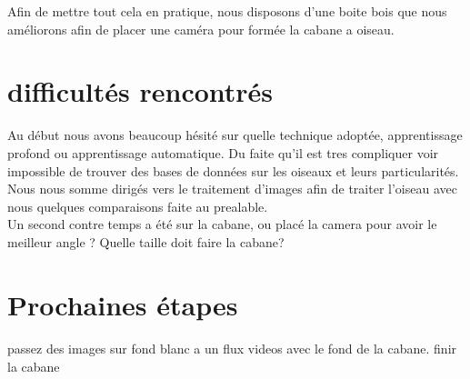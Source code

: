 \documentclass{article}
\begin{document}
Afin de mettre tout cela en pratique, nous disposons d'une boite bois que nous améliorons afin de placer une caméra pour formée la cabane a oiseau.
\section{difficultés rencontrés}
Au début nous avons beaucoup hésité sur quelle technique adoptée, apprentissage profond ou apprentissage automatique. Du faite qu'il est tres compliquer voir  impossible de trouver des bases de données sur les oiseaux et leurs particularités. Nous nous somme dirigés vers le traitement d'images afin de traiter l'oiseau avec nous quelques comparaisons faite au prealable. \\
Un second contre temps a été sur la cabane, ou placé la camera pour avoir le meilleur angle ? Quelle taille doit faire la cabane? 
\section{Prochaines étapes}
\paragraph{}
passez des images sur fond blanc a un flux videos avec le fond de la cabane. finir la cabane 
\end{document}
